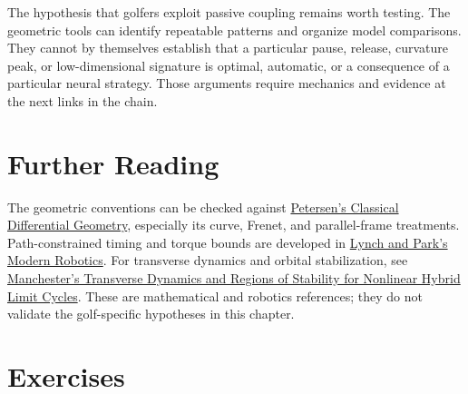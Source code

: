 \documentclass[12pt, openany]{book}
\theoremstyle{plain}
\begin{document}
The hypothesis that golfers exploit passive coupling remains worth testing.
The geometric tools can identify repeatable patterns and organize model
comparisons. They cannot by themselves establish that a particular pause,
release, curvature peak, or low-dimensional signature is optimal, automatic,
or a consequence of a particular neural strategy. Those arguments require
mechanics and evidence at the next links in the chain.

\section{Further Reading}

The geometric conventions can be checked against
\href{https://www.math.ucla.edu/~petersen/DGnotes.pdf}{Petersen's Classical
Differential Geometry}, especially its curve, Frenet, and parallel-frame
treatments. Path-constrained timing and torque bounds are developed in
\href{https://modernrobotics.northwestern.edu/nu-gm-book-resource/9-4-time-optimal-time-scaling-part-1-of-3/}{Lynch and Park's Modern Robotics}.
For transverse dynamics and orbital stabilization, see
\href{https://arxiv.org/abs/1010.2241}{Manchester's Transverse Dynamics and
Regions of Stability for Nonlinear Hybrid Limit Cycles}. These are
mathematical and robotics references; they do not validate the golf-specific
hypotheses in this chapter.

\section{Exercises}
\end{document}
